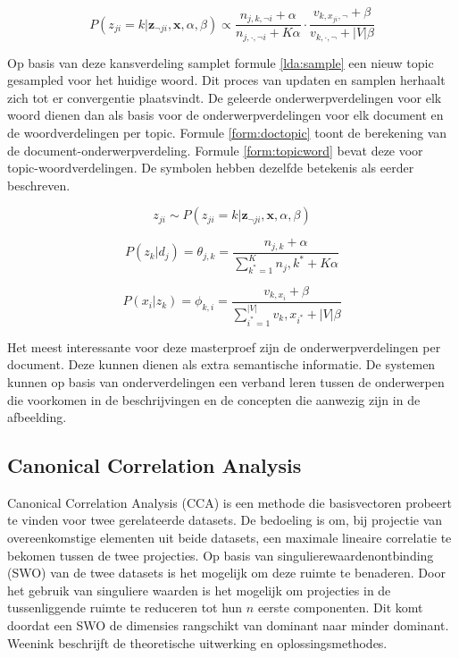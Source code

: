 \begin{equation}
    P(z_{ji} = k | \mathbf{z}_{\neg ji}, \mathbf{x}, \alpha, \beta) \propto \frac{n_{j,k,\neg i} + \alpha}{n_{j, \cdot, \neg i} + K \alpha} \cdot \frac{v_{k,x_{ji}, \neg}+ \beta}{v_{k,\cdot,\neg} + |V|\beta}
    \label{lda:update}
\end{equation}                                                                

Op basis van deze kansverdeling samplet formule \eqref{lda:sample} een nieuw topic gesampled voor het huidige woord. Dit proces van updaten en samplen herhaalt zich tot er convergentie plaatsvindt. De geleerde onderwerpverdelingen voor elk woord dienen dan als basis voor de onderwerpverdelingen voor elk document en de woordverdelingen per topic. Formule \eqref{form:doctopic} toont de berekening van de document-onderwerpverdeling. Formule \eqref{form:topicword} bevat deze voor topic-woordverdelingen. De symbolen hebben dezelfde betekenis als eerder beschreven.

\begin{equation}
    z_{ji} \sim  P(z_{ji} = k | \mathbf{z}_{\neg ji}, \mathbf{x}, \alpha, \beta)
    \label{lda:sample}
\end{equation}

\begin{equation}
    P(z_k|d_j) = \theta_{j,k} = \frac{n_{j,k} + \alpha}{\sum_{k^*=1}^K n_j,k^* + K\alpha}
    \label{form:doctopic}
\end{equation}

\begin{equation}
    P(x_i|z_k) = \phi_{k,i} = \frac{v_{k,x_i} + \beta}{\sum_{i^*=1}^{|V|} v_k,x_{i^*} + |V|\beta}
    \label{form:topicword}
\end{equation}

Het meest interessante voor deze masterproef zijn de onderwerpverdelingen per document. Deze kunnen dienen als extra semantische informatie. De systemen kunnen op basis van onderverdelingen een verband leren tussen de onderwerpen die voorkomen in de beschrijvingen en de concepten die aanwezig zijn in de afbeelding. 


\subsection{Canonical Correlation Analysis}
\label{sub:stackedcca}         
Canonical Correlation Analysis (CCA) is een methode die basisvectoren probeert te vinden voor twee gerelateerde datasets. De bedoeling is om, bij projectie van overeenkomstige elementen uit beide datasets, een maximale lineaire correlatie te bekomen tussen de twee projecties. 
Op basis van singulierewaardenontbinding (SWO) van de twee datasets is het mogelijk om deze ruimte te benaderen. Door het gebruik van singuliere waarden is het mogelijk om projecties in de tussenliggende ruimte te reduceren tot hun $n$ eerste componenten. Dit komt doordat een SWO de dimensies rangschikt van dominant naar minder dominant. Weenink\cite{Weenink2003} beschrijft de theoretische uitwerking en oplossingsmethodes.

